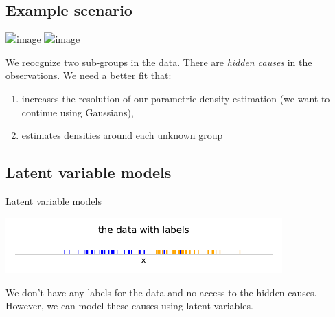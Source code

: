 \subsection{Example scenario}

\begin{frame}{\subsecname}

\svspace{-5mm}


\svspace{-5mm}

\begin{center}
	\includegraphics<2>[width=0.45\textwidth]{img/latentexample}
	\includegraphics<3->[width=0.45\textwidth]{img/latentexamplekde}
\end{center}

\svspace{-3mm}

\pause 

We reocgnize two sub-groups in the data. There are \emph{hidden causes} in the observations. We need a better fit that:

\pause

\begin{enumerate}
\item increases the resolution of our parametric density estimation (we want to continue using Gaussians),
\item estimates densities around each \underline{unknown} group
\end{enumerate}

\end{frame}

\subsection{Latent variable models}

\begin{frame}{Latent variable models}

\begin{center}
	\includegraphics[width=0.8\textwidth]{img/latentexample_nofit_labels}
\end{center}

We don't have any labels for the data and no access to the hidden causes. However, we can model these causes using latent variables.

\end{frame}

